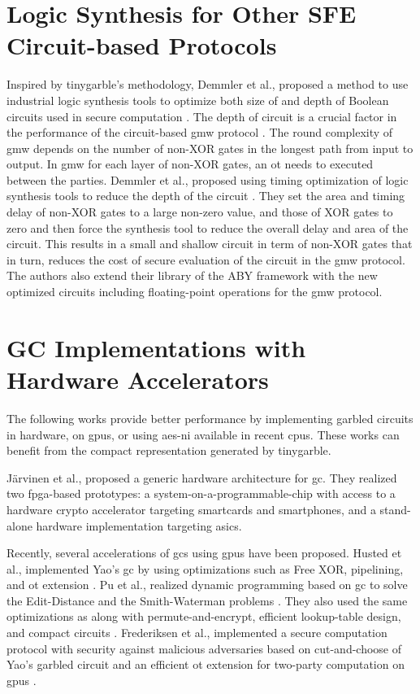 \section{Logic Synthesis for Other SFE Circuit-based Protocols} \label{sec:related-logic}
Inspired by \gls{tinygarble}'s methodology, Demmler et al., proposed a method to use industrial logic synthesis tools to optimize both size of and depth of Boolean circuits used in secure computation \cite{demmler2015automated}.
The depth of circuit is a crucial factor in the performance of the circuit-based \acrfull{gmw} protocol \cite{goldreich1987play}.
The round complexity of \acrshort{gmw} depends on the number of non-XOR gates in the longest path from input to output.
In \acrshort{gmw} for each layer of non-XOR gates, an \acrshort{ot} needs to executed between the parties.
Demmler et al., proposed using timing optimization of logic synthesis tools to reduce the depth of the circuit \cite{demmler2015automated}.
They set the area and timing delay of non-XOR gates to a large non-zero value, and those of XOR gates to zero and then force the synthesis tool to reduce the overall delay and area of the circuit.
This results in a small and shallow circuit in term of non-XOR gates that in turn, reduces the cost of secure evaluation of the circuit in the \acrshort{gmw} protocol.
The authors also extend their library of the ABY framework \cite{demmler2015aby} with the new optimized circuits including floating-point operations for the \acrshort{gmw} protocol.

\section{GC Implementations with Hardware Accelerators} \label{sec:related-hardware}
The following works provide better performance by implementing garbled circuits in hardware, on \acrshort{gpu}s, or using \acrshort{aes-ni} available in recent \acrshort{cpu}s.
These works can benefit from the compact representation generated by \gls{tinygarble}.

J\"arvinen et al., \cite{jarvinen2010garbled} proposed a generic hardware architecture for \acrshort{gc}.
They realized two \acrshort{fpga}-based prototypes: a system-on-a-programmable-chip with access to a hardware crypto accelerator targeting smartcards and smartphones, and a stand-alone hardware implementation targeting \acrshort{asic}s.

Recently, several accelerations of \acrshort{gc}s using \acrshort{gpu}s have been proposed.
Husted et al., implemented Yao's \acrshort{gc} by using optimizations such as Free XOR, pipelining, and \acrshort{ot} extension \cite{husted2013gpu}.
Pu et al., realized dynamic programming based on \acrshort{gc} to solve the Edit-Distance and the Smith-Waterman problems \cite{pu2013computing}.
They also used the same optimizations as \cite{husted2013gpu} along with permute-and-encrypt, efficient lookup-table design, and compact circuits \cite{pu2013computing}.
Frederiksen et al., implemented a secure computation protocol with security against malicious adversaries based on cut-and-choose of Yao's garbled circuit and an efficient \acrshort{ot} extension for two-party computation on \acrshort{gpu}s \cite{frederiksen2013fast}.

